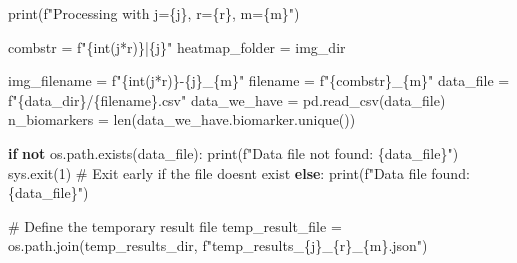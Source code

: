 \documentclass[
  letterpaper,
  DIV=11,
  numbers=noendperiod]{scrreprt}
\newenvironment{Shaded}{\begin{snugshade}}{\end{snugshade}}
\newcommand{\BuiltInTok}[1]{\textcolor[rgb]{0.00,0.23,0.31}{#1}}
\newcommand{\CommentTok}[1]{\textcolor[rgb]{0.37,0.37,0.37}{#1}}
\newcommand{\ControlFlowTok}[1]{\textcolor[rgb]{0.00,0.23,0.31}{\textbf{#1}}}
\newcommand{\DecValTok}[1]{\textcolor[rgb]{0.68,0.00,0.00}{#1}}
\newcommand{\KeywordTok}[1]{\textcolor[rgb]{0.00,0.23,0.31}{\textbf{#1}}}
\newcommand{\NormalTok}[1]{\textcolor[rgb]{0.00,0.23,0.31}{#1}}
\newcommand{\OperatorTok}[1]{\textcolor[rgb]{0.37,0.37,0.37}{#1}}
\newcommand{\SpecialCharTok}[1]{\textcolor[rgb]{0.37,0.37,0.37}{#1}}
\newcommand{\SpecialStringTok}[1]{\textcolor[rgb]{0.13,0.47,0.30}{#1}}
\begin{document}
\begin{Shaded}
\begin{Highlighting}[]
    \BuiltInTok{print}\NormalTok{(}\SpecialStringTok{f"Processing with j=}\SpecialCharTok{\{}\NormalTok{j}\SpecialCharTok{\}}\SpecialStringTok{, r=}\SpecialCharTok{\{}\NormalTok{r}\SpecialCharTok{\}}\SpecialStringTok{, m=}\SpecialCharTok{\{}\NormalTok{m}\SpecialCharTok{\}}\SpecialStringTok{"}\NormalTok{)}

\NormalTok{    combstr }\OperatorTok{=} \SpecialStringTok{f"}\SpecialCharTok{\{}\BuiltInTok{int}\NormalTok{(j}\OperatorTok{*}\NormalTok{r)}\SpecialCharTok{\}}\SpecialStringTok{|}\SpecialCharTok{\{}\NormalTok{j}\SpecialCharTok{\}}\SpecialStringTok{"}
\NormalTok{    heatmap\_folder }\OperatorTok{=}\NormalTok{ img\_dir}
    
\NormalTok{    img\_filename }\OperatorTok{=} \SpecialStringTok{f"}\SpecialCharTok{\{}\BuiltInTok{int}\NormalTok{(j}\OperatorTok{*}\NormalTok{r)}\SpecialCharTok{\}}\SpecialStringTok{{-}}\SpecialCharTok{\{}\NormalTok{j}\SpecialCharTok{\}}\SpecialStringTok{\_}\SpecialCharTok{\{}\NormalTok{m}\SpecialCharTok{\}}\SpecialStringTok{"}
\NormalTok{    filename }\OperatorTok{=} \SpecialStringTok{f"}\SpecialCharTok{\{}\NormalTok{combstr}\SpecialCharTok{\}}\SpecialStringTok{\_}\SpecialCharTok{\{}\NormalTok{m}\SpecialCharTok{\}}\SpecialStringTok{"}
\NormalTok{    data\_file }\OperatorTok{=} \SpecialStringTok{f"}\SpecialCharTok{\{}\NormalTok{data\_dir}\SpecialCharTok{\}}\SpecialStringTok{/}\SpecialCharTok{\{}\NormalTok{filename}\SpecialCharTok{\}}\SpecialStringTok{.csv"}
\NormalTok{    data\_we\_have }\OperatorTok{=}\NormalTok{ pd.read\_csv(data\_file)}
\NormalTok{    n\_biomarkers }\OperatorTok{=} \BuiltInTok{len}\NormalTok{(data\_we\_have.biomarker.unique())}

    \ControlFlowTok{if} \KeywordTok{not}\NormalTok{ os.path.exists(data\_file):}
        \BuiltInTok{print}\NormalTok{(}\SpecialStringTok{f"Data file not found: }\SpecialCharTok{\{}\NormalTok{data\_file}\SpecialCharTok{\}}\SpecialStringTok{"}\NormalTok{)}
\NormalTok{        sys.exit(}\DecValTok{1}\NormalTok{)  }\CommentTok{\# Exit early if the file doesn\textquotesingle{}t exist}
    \ControlFlowTok{else}\NormalTok{:}
        \BuiltInTok{print}\NormalTok{(}\SpecialStringTok{f"Data file found: }\SpecialCharTok{\{}\NormalTok{data\_file}\SpecialCharTok{\}}\SpecialStringTok{"}\NormalTok{)}

    \CommentTok{\# Define the temporary result file}
\NormalTok{    temp\_result\_file }\OperatorTok{=}\NormalTok{ os.path.join(temp\_results\_dir, }\SpecialStringTok{f"temp\_results\_}\SpecialCharTok{\{}\NormalTok{j}\SpecialCharTok{\}}\SpecialStringTok{\_}\SpecialCharTok{\{}\NormalTok{r}\SpecialCharTok{\}}\SpecialStringTok{\_}\SpecialCharTok{\{}\NormalTok{m}\SpecialCharTok{\}}\SpecialStringTok{.json"}\NormalTok{)}


\end{Highlighting}
\end{Shaded}
\end{document}
